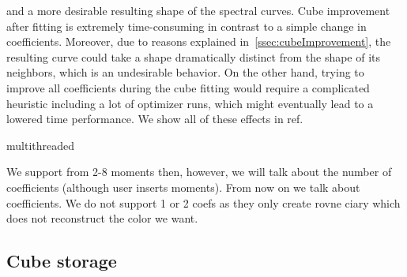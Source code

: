 and a more desirable resulting shape of the spectral curves. Cube improvement after fitting is extremely time-consuming in contrast to a simple change in coefficients. Moreover, due to reasons explained in~\cref{ssec:cubeImprovement}, the resulting curve could take a shape dramatically distinct from the shape of its neighbors, which is an undesirable behavior. On the other hand, trying to improve all coefficients during the cube fitting would require a complicated heuristic including a lot of optimizer runs, which might eventually lead to a lowered time performance. We show all of these effects in ref.


multithreaded 

We support from 2-8 moments then, however, we will talk about the number of coefficients (although user inserts moments). From now on we talk about coefficients. We do not support 1 or 2 coefs as they only create rovne ciary which does not reconstruct the color we want.

\subsection{Cube storage}
	
